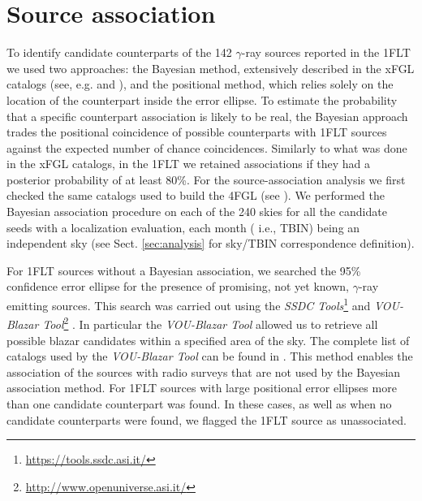 \documentclass{aastex62}
\begin{document}
\section{Source association} \label{sec:assoc}

To identify candidate counterparts of the 142 $\gamma$-ray sources reported in the 1FLT we used two approaches: the Bayesian method, extensively described in the xFGL catalogs (see, e.g. \citealt{acero2015fermi3FGL} and \citealt{20204FGL}), and the positional method, which relies solely on the location of the counterpart inside the error ellipse.
%
To estimate the probability that a specific counterpart association is likely to be real, the Bayesian approach trades the positional coincidence of possible counterparts with 1FLT sources against the expected number of chance coincidences. 
Similarly to what was done in the xFGL catalogs, in the 1FLT we retained associations if they had a posterior probability of at least 80\%. 
For the source-association analysis we first checked the same catalogs used to build the 4FGL (see \citealt{20204FGL}). 
We performed the Bayesian association procedure on each of the 240 skies for all the candidate seeds with a localization evaluation, each month ( i.e., TBIN) being an independent sky (see Sect. \ref{sec:analysis} for sky/TBIN correspondence definition).

For 1FLT sources without a Bayesian association, we searched the 95\% confidence error ellipse for the presence of promising, not yet known, $\gamma$-ray emitting sources. 
This search was carried out using the {\it SSDC Tools}\footnote{\url{https://tools.ssdc.asi.it/}} and {\it VOU-Blazar Tool}\footnote{\label{fn:open}\url{http://www.openuniverse.asi.it/}} \citep{chang2020open}.
In particular the {\it VOU-Blazar Tool} allowed us to retrieve all possible blazar candidates within a specified area of the sky. 
The complete list of catalogs used by the {\it VOU-Blazar Tool} can be found in \citet{brandt2018}. 
This method enables the association of the sources with radio surveys that are not used by the Bayesian association method. 
For 1FLT sources with large positional error ellipses more than one  candidate counterpart was found. In these cases, as well as when no candidate counterparts were found, we flagged the 1FLT source as unassociated.
\end{document}
